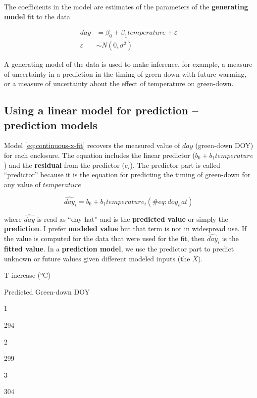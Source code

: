 \documentclass[]{book}
\begin{document}
The coefficients in the model are estimates of the parameters of the \textbf{generating model} fit to the data

\begin{align}
day &= \beta_0 + \beta_1 temperature + \varepsilon\\
\varepsilon &\sim N(0, \sigma^2)
\label{eq:continuous-x-m1}
\end{align}

A generating model of the data is used to make inference, for example, a measure of uncertainty in a prediction in the timing of green-down with future warming, or a measure of uncertainty about the effect of temperature on green-down.

\hypertarget{using-a-linear-model-for-prediction-prediction-models}{%
\subsection{Using a linear model for prediction -- prediction models}\label{using-a-linear-model-for-prediction-prediction-models}}

Model \eqref{eq:continuous-x-fit} recovers the measured value of \(day\) (green-down DOY) for each enclosure. The equation includes the linear predictor (\(b_0 + b_1 temperature\)) and the \textbf{residual} from the predictor (\(e_i\)). The predictor part is called ``predictor'' because it is the equation for predicting the timing of green-down for any value of \(temperature\)

\begin{equation}
\widehat{day}_i = b_0 + b_1 temperature_i
(\#eq:doy_hat)
\end{equation}

where \(\widehat{day}\) is read as ``day hat'' and is the \textbf{predicted value} or simply the \textbf{prediction}. I prefer \textbf{modeled value} but that term is not in widespread use. If the value is computed for the data that were used for the fit, then \(\widehat{day}_i\) is the \textbf{fitted value}. In a \textbf{prediction model}, we use the predictor part to predict unknown or future values given different modeled inputs (the \(X\)).

T increase (°C)

Predicted Green-down DOY

1

294

2

299

3

304
\end{document}
